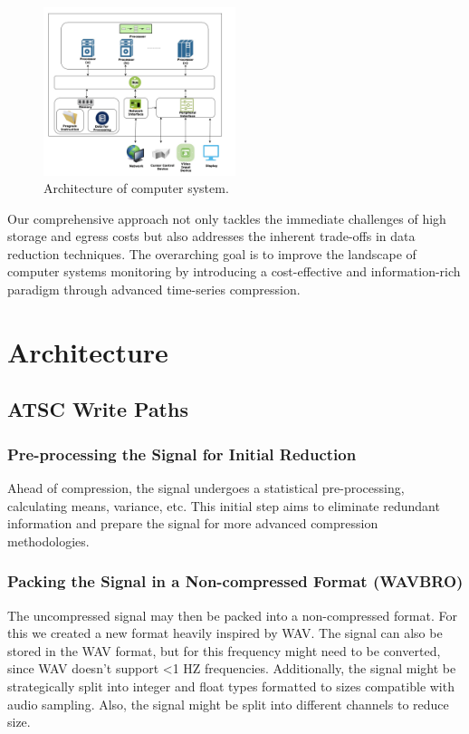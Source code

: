 \documentclass[conference]{IEEEtran}
\begin{document}
  
\begin{figure}[h]
  \centering
  \includegraphics[width=0.5\textwidth]{Fig2.png}
  \caption{Architecture of computer system.}
  \label{Fig.2}
\end{figure}

Our comprehensive approach not only tackles the immediate challenges of high storage and egress costs but also addresses the inherent trade-offs in data reduction techniques. The overarching goal is to improve the landscape of computer systems monitoring by introducing a cost-effective and information-rich paradigm through advanced time-series compression. 



\section{Architecture}

\subsection{ATSC Write Paths}

\subsubsection{Pre-processing the Signal for Initial Reduction}
Ahead of compression, the signal undergoes a statistical pre-processing, calculating means, variance, etc. This initial step aims to eliminate redundant information and prepare the signal for more advanced compression methodologies.

\vspace{10pt}
\subsubsection{Packing the Signal in a Non-compressed Format (WAVBRO)}
The uncompressed signal may then be packed into a non-compressed format. For this we created a new format heavily inspired by WAV. The signal can also be stored in the WAV format, but for this frequency might need to be converted, since WAV doesn't support <1 HZ frequencies. Additionally, the signal might be strategically split into integer and float types formatted to sizes compatible with audio sampling. Also, the signal might be split into different channels to reduce size. 
\end{document}
